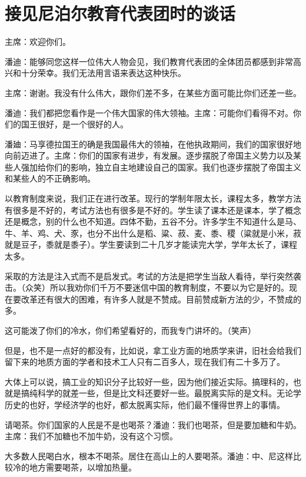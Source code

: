 \section[接见尼泊尔教育代表团时的谈话（一九六四年八月二十九日）]{接见尼泊尔教育代表团时的谈话}


主席：欢迎你们。

潘迪：能够同您这样一位伟大人物会见，我们教育代表团的全体团员都感到非常高兴和十分荣幸。我们无法用言语来表达这种快乐。

主席：谢谢。我没有什么伟大，跟你们差不多，在某些方面可能比你们还差一些。

潘迪：我们都把您看作是一个伟大国家的伟大领袖。主席：可能你们看得不对。你们的国王很好，是一个很好的人。

潘廸：马享德拉国王的确是我国最伟大的领袖，在他执政期间，我们的国家很好地向前迈进了。主席：你们的国家有进步，有发展。逐步摆脱了帝国主义势力以及某些人强加给你们的影响，独立自主地建设自己的国家。我们也逐步摆脱了帝国主义和某些人的不正确影响。

以教育制度来说，我们正在进行改革。现行的学制年限太长，课程太多，教学方法有很多是不好的，考试方法也有很多是不好的。学生读了课本还是课本，学了概念还是概念，别的什么也不知道。四体不勤，五谷不分。许多学生不知道什么是马、牛、羊、鸡、犬、豕，也分不出什么是稻、粱、菽、麦、黍、稷（粱就是小米，菽就是豆子，黍就是黍子）。学生要读到二十几岁才能读完大学，学年太长了，课程太多。

采取的方法是注入式而不是启发式。考试的方法是把学生当敌人看待，举行突然袭击。（众笑）所以我劝你们千万不要迷信中国的教育制度，不要以为它是好的。现在要改革还有很大的困难，有许多人就是不赞成。目前赞成新方法的少，不赞成的多。

这可能泼了你们的冷水，你们希望看好的，而我专门讲坏的。（笑声）

但是，也不是一点好的都没有，比如说，拿工业方面的地质学来讲，旧社会给我们留下来的地质方面的学者和技术工人只有二百多人，现在我们有二十多万了。

大体上可以说，搞工业的知识分子比较好一些，因为他们接近实际。搞理科的，也就是搞纯科学的就差一些，但是比文科还要好一些。最脱离实际的是文科。无论学历史的也好，学经济学的也好，都太脱离实际，他们最不懂得世界上的事情。

请喝茶。你们国家的人民是不是也喝茶？潘迪：我们也喝茶，但是要加糖和牛奶。主席：我们不加糖也不加牛奶，没有这个习惯。

大多数人民喝白水，根本不喝茶。居住在高山上的人要喝茶。潘迪：中、尼这样比较冷的地方需要喝茶，以增加热量。

